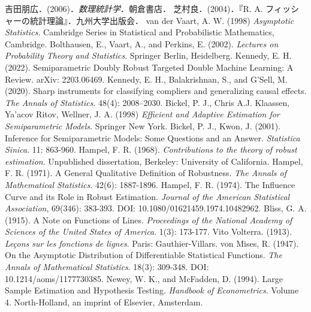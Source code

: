 \documentclass[uplatex,dvipdfmx]{jsreport}
\begin{document}
\begin{thebibliography}{99}
    吉田朋広．(2006)．\textit{数理統計学}．朝倉書店．
    芝村良．(2004)．『R. A. フィッシャーの統計理論』．九州大学出版会．
    van der Vaart, A. W. (1998) \textit{Asymptotic Statistics}. Cambridge Series in Statistical and Probabilistic Mathematics, Cambridge.
    Bolthausen, E., Vaart, A., and Perkins, E. (2002). \textit{Lectures on Probability Theory and Statistics}. Springer Berlin, Heidelberg.
    Kennedy, E. H. (2022). Semiparametric Doubly Robust Targeted Double Machine Learning: A Review. arXiv: 2203.06469.
    Kennedy, E. H., Balakrishnan, S., and G’Sell, M. (2020). Sharp instruments for classifying compliers and generalizing causal effects. \textit{The Annals of Statistics}. 48(4): 2008–2030.
    Bickel, P. J., Chris A.J. Klaassen, Ya'acov Ritov, Wellner, J. A. (1998) \textit{Efficient and Adaptive Estimation for Semiparametric Models}. Springer New York.
    Bickel, P. J., Kwon, J. (2001). Inference for Semiparametric Models: Some Questions and an Answer. \textit{Statistica Sinica}. 11: 863-960.
    Hampel, F. R. (1968). \textit{Contributions to the theory of robust estimation}. Unpublished dissertation, Berkeley: University of California.
    Hampel, F. R. (1971). A General Qualitative Definition of Robustness. \textit{The Annals of Mathematical Statistics}. 42(6): 1887-1896.
    Hampel, F. R. (1974). The Influence Curve and its Role in Robust Estimation. \textit{Journal of the American Statistical Association}, 69(346): 383-393. DOI: 10.1080/01621459.1974.10482962.
    Bliss, G. A. (1915). A Note on Functions of Lines. \textit{Proceedings of the National Academy of Sciences of the United States of America}. 1(3): 173-177.
    Vito Volterra. (1913). \textit{Le\c{c}ons sur les fonctions de lignes}. Paris: Gauthier-Villars.
    von Mises, R. (1947). On the Asymptotic Distribution of Differentiable Statistical Functions. \textit{The Annals of Mathematical Statistics}. 18(3): 309-348. DOI: 10.1214/aoms/1177730385.
    Newey, W. K., and McFadden, D. (1994). Large Sample Estimation and Hypothesis Testing. \textit{Handbook of Econometrics}. Volume 4. North-Holland, an imprint of Elsevier, Amsterdam.

\end{thebibliography}
\end{document}
